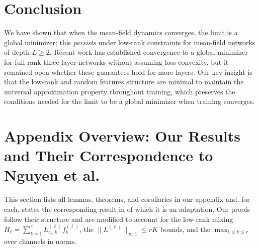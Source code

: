 \documentclass[nohyperref]{article}
\theoremstyle{plain}
\theoremstyle{definition}
\theoremstyle{remark}
\begin{document}
\section{Conclusion}
\label{sec:conclusion}




We have shown that when the mean-field dynamics converges, the limit is a global minimizer; this \emph{persists} under low-rank constraints for mean-field networks of depth $L \ge 2$. Recent work has established convergence to a global minimizer for full-rank three-layer networks without assuming loss convexity, but it remained open whether these guarantees hold for more layers. Our key insight is that the low-rank and random features structure are minimal to maintain the universal approximation property throughout training, which preserves the conditions needed for the limit to be a global minimizer when training converges.





\newpage
\onecolumn
\appendix

\section{Appendix Overview: Our Results and Their Correspondence to Nguyen et al.}
\label{app:lemma-mapping}

This section lists all lemmas, theorems, and corollaries in our appendix and, for each, states the corresponding result in \cite{nguyen2023rigorousframeworkmeanfield} of which it is an adaptation. Our proofs follow their structure and are modified to account for the low-rank mixing $H_\ell=\sum_{k=1}^r L^{(\ell)}_{c_\ell,k}f_k^{(\ell)}$, the $\|L^{(\ell)}\|_{\infty,1}\le rK$ bounds, and the $\max_{1\le k\le r}$ over channels in norms.
\end{document}
